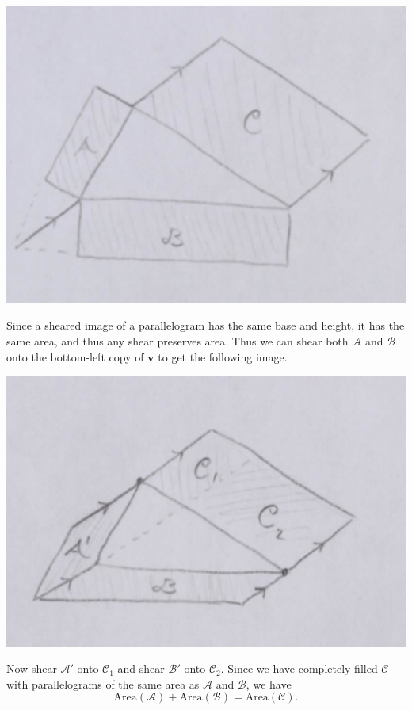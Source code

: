 \documentclass[twoside,10pt]{article}
\begin{document}
\begin{center}
        \includegraphics[scale=0.7]{fig/21}
\end{center}

Since a sheared image of a parallelogram has the same base and height, it has the same area, and thus any shear preserves area. Thus we can shear both $\mathcal{A}$ and $\mathcal{B}$ onto the bottom-left copy of $\mathbf{v}$ to get the following image.

\begin{center}
        \includegraphics[scale=0.7]{fig/22}
\end{center}

Now shear $\mathcal{A}'$ onto $\mathcal{C}_1$ and shear $\mathcal{B}'$ onto $\mathcal{C}_{2}$. Since we have completely filled $\mathcal{C}$ with parallelograms of the same area as $\mathcal{A}$ and $\mathcal{B}$, we have
\[
	\text{Area}(\mathcal{A}) + \text{Area}(\mathcal{B}) = \text{Area}(\mathcal{C}).
\] 
\end{document}
